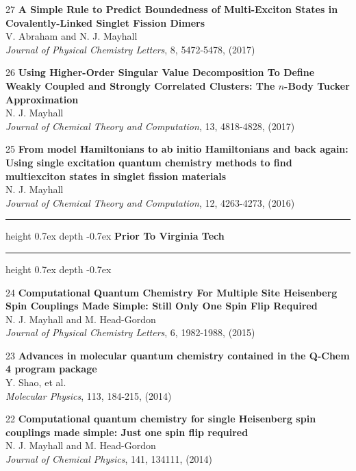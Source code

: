 \documentclass[10pt]{article}
\newenvironment{lonelist}[1][\enskip\textbullet]%
        {\vspace{-\baselineskip}\begin{list}{#1}{%
        \setlength{\partopsep}{0pt}%
        \setlength{\topsep}{0pt}}}
        {\end{list}\vspace{-.6\baselineskip}}
\def\Vhrulefill{\leavevmode\leaders\hrule height 0.7ex depth \dimexpr0.4pt-0.7ex\hfill\kern0pt}
\begin{document}
\begin{lonelist}
\item[27\hspace{4pt}] \textbf{A Simple Rule to Predict Boundedness of Multi-Exciton States in Covalently-Linked Singlet Fission Dimers}\\
V. Abraham and N. J. Mayhall\\
\textsl{Journal of Physical Chemistry Letters}, 8, 5472-5478, (2017)

\item[26\hspace{4pt}] \textbf{Using Higher-Order Singular Value Decomposition To Define Weakly Coupled and Strongly Correlated Clusters: The $n$-Body Tucker Approximation}\\
N. J. Mayhall\\
\textsl{Journal of Chemical Theory and Computation}, 13, 4818-4828, (2017)

\item[25\hspace{4pt}] \textbf{From model Hamiltonians to ab initio Hamiltonians and back again: Using single excitation quantum chemistry methods to find multiexciton states in singlet fission materials}\\
N. J. Mayhall\\
\textsl{Journal of Chemical Theory and Computation}, 12, 4263-4273, (2016)

\begin{center}
	\vspace{5pt}
	\Vhrulefill{} \textbf{Prior To Virginia Tech} {} \Vhrulefill
	\vspace{4pt}
\end{center}


\item[24\hspace{4pt}] \textbf{Computational Quantum Chemistry For Multiple Site Heisenberg Spin Couplings Made Simple: Still Only One Spin Flip Required}\\
N. J. Mayhall and M. Head-Gordon\\
\textsl{Journal of Physical Chemistry Letters}, 6, 1982-1988, (2015)


\item[23\hspace{4pt}] \textbf{Advances in molecular quantum chemistry contained in the Q-Chem 4 program package}\\
Y. Shao, et al.\\
\textsl{Molecular Physics}, 113, 184-215, (2014)

\item[22\hspace{4pt}] \textbf{Computational quantum chemistry for single Heisenberg spin couplings made simple: Just one spin flip required}\\
N. J. Mayhall and M. Head-Gordon\\
\textsl{Journal of Chemical Physics}, 141, 134111, (2014)




\end{lonelist}
\end{document}
